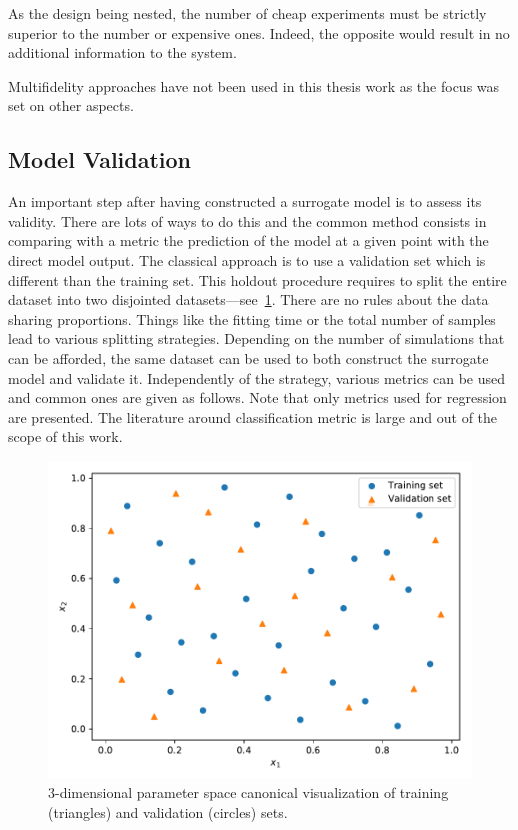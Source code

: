 As the design being nested, the number of cheap experiments must be strictly superior to the number or expensive ones. Indeed, the opposite would result in no additional information to the system.

Multifidelity approaches have not been used in this thesis work as the focus was set on other aspects.

\subsection{Model Validation}\label{sec:validation}
An important step after having constructed a surrogate model is to assess its validity. There are lots of ways to do this and the common method consists in comparing with a metric the prediction of the model at a given point with the direct model output. The classical approach is to use a validation set which is different than the training set. This holdout procedure requires to split the entire dataset into two disjointed datasets---see~\cref{fig:validation}. There are no rules about the data sharing proportions. Things like the fitting time or the total number of samples lead to various splitting strategies. Depending on the number of simulations that can be afforded, the same dataset can be used to both construct the surrogate model and validate it. Independently of the strategy, various metrics can be used and common ones are given as follows. Note that only metrics used for regression are presented. The literature around classification metric is large and out of the scope of this work. 

\begin{figure}[!ht]
\centering
\includegraphics[width=0.7\linewidth,keepaspectratio]{fig/literature/validation_set.pdf}
\caption{3-dimensional parameter space canonical visualization of training (triangles) and validation (circles) sets.}
\label{fig:validation}
\end{figure}

